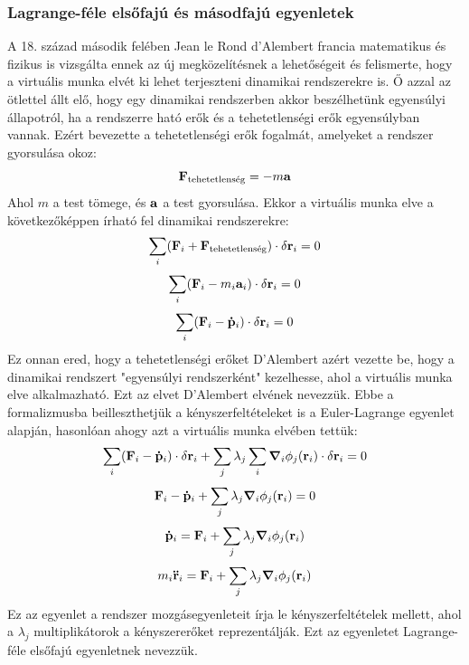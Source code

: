 \documentclass[a4paper,12pt]{article}
\begin{document}
\subsubsection{Lagrange-féle elsőfajú és másodfajú egyenletek}
A 18. század második felében Jean le Rond d'Alembert francia matematikus és fizikus is vizsgálta ennek az új megközelítésnek a lehetőségeit és felismerte, hogy a virtuális munka elvét ki lehet terjeszteni dinamikai rendszerekre is.
Ő azzal az ötlettel állt elő, hogy egy dinamikai rendszerben akkor beszélhetünk egyensúlyi állapotról, ha a rendszerre ható erők és a tehetetlenségi erők egyensúlyban vannak. Ezért bevezette a tehetetlenségi erők fogalmát, amelyeket a rendszer gyorsulása okoz:
\begin{equation}
    \bold{F}_{\text{tehetetlenség}} = -m \bold{a}
\end{equation}
Ahol $m$ a test tömege, és $\bold{a}$ a test gyorsulása. Ekkor a virtuális munka elve a következőképpen írható fel dinamikai rendszerekre:
\begin{equation}
    \sum_i (\bold{F}_i + \bold{F}_{\text{tehetetlenség}}) \cdot \delta \bold{r}_i = 0
\end{equation}
\begin{equation}
    \sum_i (\bold{F}_i - m_i \bold{a}_i) \cdot \delta \bold{r}_i = 0
\end{equation}
\begin{equation}
    \sum_i (\bold{F}_i - \bold{\dot{p}}_i) \cdot \delta \bold{r}_i = 0
\end{equation}
Ez onnan ered, hogy a tehetetlenségi erőket D'Alembert azért vezette be, hogy a dinamikai rendszert "egyensúlyi rendszerként" kezelhesse, ahol a virtuális munka elve alkalmazható. Ezt az elvet D'Alembert elvének nevezzük.
Ebbe a formalizmusba beilleszthetjük a kényszerfeltételeket is a Euler-Lagrange egyenlet alapján, hasonlóan ahogy azt a virtuális munka elvében tettük:
\begin{equation}
    \sum_i (\bold{F}_i - \bold{\dot{p}}_i) \cdot \delta \bold{r}_i + \sum_j \lambda_j \sum_i \boldsymbol{\nabla}_i \phi_j(\bold{r}_i) \cdot \delta \bold{r}_i = 0  
\end{equation}
\begin{equation}
    \bold{F}_i - \bold{\dot{p}}_i + \sum_j \lambda_j \boldsymbol{\nabla}_i \phi_j(\bold{r}_i) = 0
\end{equation}
\begin{equation}
    \bold{\dot{p}}_i = \bold{F}_i + \sum_j \lambda_j \boldsymbol{\nabla}_i \phi_j(\bold{r}_i)
\end{equation}
\begin{equation}
    m_i \bold{\ddot{r}}_i = \bold{F}_i + \sum_j \lambda_j \boldsymbol{\nabla}_i \phi_j(\bold{r}_i)
\end{equation}
Ez az egyenlet a rendszer mozgásegyenleteit írja le kényszerfeltételek mellett, ahol a $\lambda_j$ multiplikátorok a kényszererőket reprezentálják. Ezt az egyenletet Lagrange-féle elsőfajú egyenletnek nevezzük.
\end{document}
